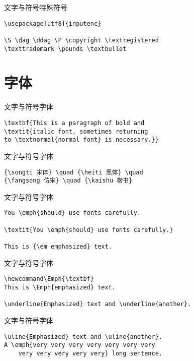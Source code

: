 \documentclass[11pt]{beamer}
\begin{document}
\begin{frame}[fragile]{文字与符号}{特殊符号}
\begin{Verbatim}[tabsize=2]
\usepackage[utf8]{inputenc}

\S \dag \ddag \P \copyright \textregistered 
\texttrademark \pounds \textbullet
\end{Verbatim}
\end{frame}

\section{字体}

\begin{frame}[fragile]{文字与符号}{字体}
\begin{Verbatim}[tabsize=2]
\textbf{This is a paragraph of bold and
\textit{italic font, sometimes returning
to \textnormal{normal font} is necessary.}}
\end{Verbatim}
\end{frame}

\begin{frame}[fragile]{文字与符号}{字体}
\begin{Verbatim}[tabsize=2]
{\songti 宋体} \quad {\heiti 黑体} \quad
{\fangsong 仿宋} \quad {\kaishu 楷书}
\end{Verbatim}
\end{frame}

\begin{frame}[fragile]{文字与符号}{字体}
\begin{Verbatim}[tabsize=2]
You \emph{should} use fonts carefully.

\textit{You \emph{should} use fonts carefully.}

This is {\em emphasized} text.
\end{Verbatim}
\end{frame}

\begin{frame}[fragile]{文字与符号}{字体}
\begin{Verbatim}[tabsize=2]
\newcommand\Emph{\textbf}
This is \Emph{emphasized} text.

\underline{Emphasized} text and \underline{another}.
\end{Verbatim}
\end{frame}

\begin{frame}[fragile]{文字与符号}{字体}
\begin{Verbatim}[tabsize=2]
% 导言区用 \usepackage{ulem}
\uline{Emphasized} text and \uline{another}.
A \emph{very very very very very very very
	very very very very very} long sentence.
\end{Verbatim}
\end{frame}
\end{document}
